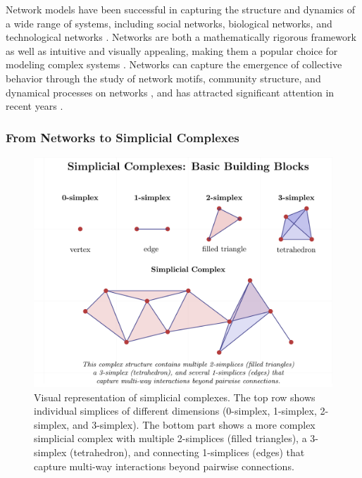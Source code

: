 Network models have been successful in capturing the structure and dynamics of a wide range of systems, including social networks, biological networks, and technological networks \citep{newman2003structure, albert2002statistical, strogatz2001exploring}. Networks are both a mathematically rigorous framework as well as intuitive and visually appealing, making them a popular choice for modeling complex systems \citep{newman2010networks}. Networks can capture the emergence of collective behavior through the study of network motifs, community structure, and dynamical processes on networks \citep{milo2002network, fortunato2010community, barrat2008dynamical}, and has attracted significant attention in recent years \citep{barabasi2016network}.

\subsubsection{From Networks to Simplicial Complexes}

\begin{figure}[htbp]
    \centering
    \includegraphics[width=\textwidth]{figures/simplicial_complexes-1.png}
    \caption{Visual representation of simplicial complexes. The top row shows individual simplices of different dimensions (0-simplex, 1-simplex, 2-simplex, and 3-simplex). The bottom part shows a more complex simplicial complex with multiple 2-simplices (filled triangles), a 3-simplex (tetrahedron), and connecting 1-simplices (edges) that capture multi-way interactions beyond pairwise connections.}
    \label{fig:simplicial_complexes}
\end{figure}

